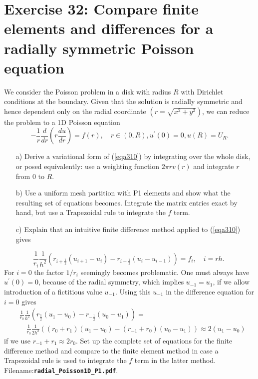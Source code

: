 \documentclass[../main.tex]{subfiles}
\begin{document}
	\section*{Exercise 32: Compare finite elements and differences for a radially symmetric Poisson equation}
		\noindent We consider the Poisson problem in a disk with radius $R$ with Dirichlet conditions at the boundary. Given that the solution is radially symmetric and hence dependent only on the radial coordinate $\left(r=\sqrt{x^{2}+y^{2}}\right)$, we can reduce the problem to a 1D Poisson equation
		\begin{equation}
			\label{eqa310}
			-\frac{1}{r} \frac{d}{d r}\left(r \frac{d u}{d r}\right)=f(r), \quad r \in(0, R), u^{\prime}(0)=0, u(R)=U_{R} .
		\end{equation}
		\begin{enumerate}
			\item [a)] Derive a variational form of (\ref{eqa310}) by integrating over the whole disk, or posed equivalently: use a weighting function $2 \pi r v(r)$ and integrate $r$ from 0 to $R$.
			\item[b)] Use a uniform mesh partition with P1 elements and show what the resulting set of equations becomes. Integrate the matrix entries exact by hand, but use a Trapezoidal rule to integrate the $f$ term.
			\item[c)]Explain that an intuitive finite difference method applied to (\ref{eqa310}) gives
		\end{enumerate}
		$$
		\frac{1}{r_{i}} \frac{1}{h^{2}}\left(r_{i+\frac{1}{2}}\left(u_{i+1}-u_{i}\right)-r_{i-\frac{1}{2}}\left(u_{i}-u_{i-1}\right)\right)=f_{i}, \quad i=r h \text {. }
		$$\smallbreak
		For $i=0$ the factor $1 / r_{i}$ seemingly becomes problematic. One must always have $u^{\prime}(0)=0$, because of the radial symmetry, which implies $u_{-1}=u_{1}$, if we allow introduction of a fictitious value $u_{-1}$. Using this $u_{-1}$ in the difference equation for $i=0$ gives
		$$
		\begin{aligned}
			&\frac{1}{r_{0}} \frac{1}{h^{2}}\left(r_{\frac{1}{2}}\left(u_{1}-u_{0}\right)-r_{-\frac{1}{2}}\left(u_{0}-u_{1}\right)\right)= \\
			&\quad \frac{1}{r_{0}} \frac{1}{2 h^{2}}\left(\left(r_{0}+r_{1}\right)\left(u_{1}-u_{0}\right)-\left(r_{-1}+r_{0}\right)\left(u_{0}-u_{1}\right)\right) \approx 2\left(u_{1}-u_{0}\right)
		\end{aligned}
		$$
		if we use $r_{-1}+r_{1} \approx 2 r_{0}$.\smallbreak
		Set up the complete set of equations for the finite difference method and compare to the finite element method in case a Trapezoidal rule is used to integrate the $f$ term in the latter method.
		Filename:\textbf{\texttt{radial\_Poisson1D\_P1.pdf}}. \bigbreak
\end{document}
